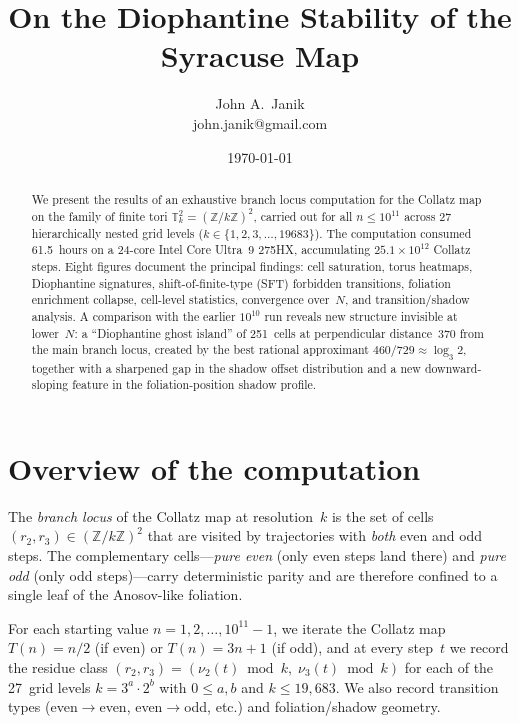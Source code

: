 \documentclass[11pt]{article}
\title{On the Diophantine Stability of the Syracuse Map}
\author{John A.\ Janik\\
john.janik@gmail.com}
\date{\today}
\newcommand{\Z}{\mathbb{Z}}
\newcommand{\T}{\mathbb{T}}
\begin{document}
\maketitle

\begin{abstract}
We present the results of an exhaustive branch locus computation for
the Collatz map on the family of finite tori
$\T^2_k = (\Z/k\Z)^2$, carried out for all
$n \le 10^{11}$ across 27 hierarchically nested grid levels
($k \in \{1, 2, 3, \ldots, 19683\}$).  The computation consumed
61.5~hours on a 24-core Intel Core Ultra~9 275HX, accumulating
$25.1 \times 10^{12}$ Collatz steps.  Eight figures document the
principal findings: cell saturation, torus heatmaps, Diophantine
signatures, shift-of-finite-type (SFT) forbidden transitions,
foliation enrichment collapse, cell-level statistics, convergence
over~$N$, and transition/shadow analysis.  A comparison with the
earlier $10^{10}$ run reveals new structure invisible at lower~$N$:
a ``Diophantine ghost island'' of 251~cells at perpendicular
distance~370 from the main branch locus, created by the best rational
approximant $460/729 \approx \log_3 2$, together with a sharpened
gap in the shadow offset distribution and a new downward-sloping
feature in the foliation-position shadow profile.
\end{abstract}

\section{Overview of the computation}
\label{sec:overview}

The \emph{branch locus} of the Collatz map at resolution~$k$ is the
set of cells $(r_2, r_3) \in (\Z/k\Z)^2$ that are visited by
trajectories with \emph{both} even and odd steps.  The complementary
cells---\emph{pure even} (only even steps land there) and
\emph{pure odd} (only odd steps)---carry deterministic parity and
are therefore confined to a single leaf of the Anosov-like foliation.

For each starting value $n = 1, 2, \ldots, 10^{11} - 1$, we iterate
the Collatz map $T(n) = n/2$ (if even) or $T(n) = 3n+1$ (if odd),
and at every step~$t$ we record the residue class
$(r_2, r_3) = (\nu_2(t) \bmod k,\; \nu_3(t) \bmod k)$ for each of the
27~grid levels $k = 3^a \cdot 2^b$ with $0 \le a,b$ and
$k \le 19{,}683$.  We also record transition types (even$\to$even,
even$\to$odd, etc.) and foliation/shadow geometry.
\end{document}
